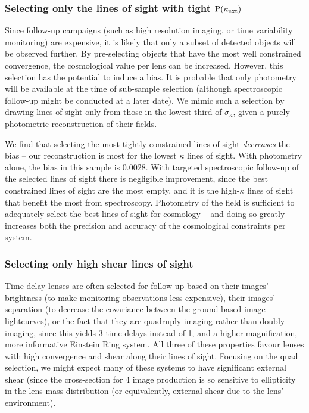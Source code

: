 \documentclass[useAMS,usenatbib]{mn2e}
\begin{document}
\subsubsection{Selecting only the lines of sight with tight ${\rm P}(\kappa_{\rm ext})$}
\label{sec:bias:tightPDF}

Since follow-up campaigns (such as high resolution imaging, or time
variability monitoring) are expensive, it is likely that only a subset of
detected objects will be observed further. By pre-selecting objects that have 
the most well constrained convergence, the cosmological value per lens can be
increased. However, this selection has the potential to induce a bias. It is
probable that only photometry will be available at the time of sub-sample
selection (although spectroscopic follow-up might be conducted at a later
date). We mimic such a selection by drawing lines of sight only from those in
the lowest third of $\sigma_{\kappa}$, given a purely photometric
reconstruction of their fields. 

We find that selecting the most tightly constrained lines of sight {\it
decreases} the bias -- our reconstruction is most \succesful for the lowest
$\kappa$ lines of sight. With photometry alone, the bias in this sample is
0.0028. With targeted spectroscopic follow-up of the selected lines of sight
there is negligible improvement, since the best constrained lines of sight are
the most empty, and it is the high-$\kappa$ lines of sight that benefit the
most from spectroscopy. Photometry of the field is sufficient to adequately
select the best lines of sight for cosmology -- and doing so greatly increases
both the precision and accuracy of the cosmological constraints per system.


\subsubsection{Selecting only high shear lines of sight}
\label{sec:bias:tightPDF}

Time delay lenses are often selected for follow-up based on their images'
brightness (to make monitoring observations less expensive), their images'
separation (to decrease the covariance between the ground-based image
lightcurves), or the fact that they are quadruply-imaging rather than
doubly-imaging, since this yields 3 time delays instead of 1, and a higher
magnification, more informative Einstein Ring system. All three of these
properties favour lenses with high convergence and shear along their lines of
sight. Focusing on the quad selection, we might expect many of these systems
to have significant external shear (since the cross-section for 4 image
production is so sensitive to ellipticity in the lens mass distribution (or
equivalently, external shear due to the lens' environment). 
\end{document}
